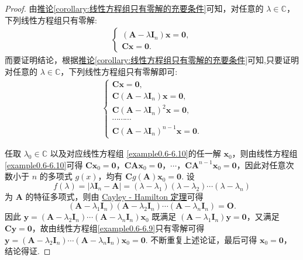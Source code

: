 \documentclass[../../main.tex]{subfiles}
\begin{document}
\begin{proof}
由\hyperref[corollary:线性方程组只有零解的充要条件]{推论\ref{corollary:线性方程组只有零解的充要条件}}可知，对任意的 $\lambda\in\mathbb{C}$，下列线性方程组只有零解:
\begin{align}
\begin{cases}
(\boldsymbol{A}-\lambda\boldsymbol{I}_n)\boldsymbol{x}=\boldsymbol{0}, \\
\boldsymbol{C}\boldsymbol{x}=\boldsymbol{0}.
\end{cases} \label{example0.6-6.9}
\end{align}
而要证明结论，根据\hyperref[corollary:线性方程组只有零解的充要条件]{推论\ref{corollary:线性方程组只有零解的充要条件}}可知,只要证明对任意的 $\lambda\in\mathbb{C}$，下列线性方程组只有零解即可:
\begin{align}
\begin{cases}
\boldsymbol{C}\boldsymbol{x}=\boldsymbol{0}, \\
\boldsymbol{C}(\boldsymbol{A}-\lambda\boldsymbol{I}_n)\boldsymbol{x}=\boldsymbol{0}, \\
\boldsymbol{C}(\boldsymbol{A}-\lambda\boldsymbol{I}_n)^2\boldsymbol{x}=\boldsymbol{0}, \\
\cdots\cdots\cdots \\
\boldsymbol{C}(\boldsymbol{A}-\lambda\boldsymbol{I}_n)^{n - 1}\boldsymbol{x}=\boldsymbol{0}.
\end{cases} \label{example0.6-6.10}
\end{align}

任取 $\lambda_0\in\mathbb{C}$ 以及对应线性方程组 \eqref{example0.6-6.10}的任一解 $\boldsymbol{x}_0$，则由线性方程组 \eqref{example0.6-6.10}可得 $\boldsymbol{C}\boldsymbol{x}_0=\boldsymbol{0}$，$\boldsymbol{C}\boldsymbol{A}\boldsymbol{x}_0=\boldsymbol{0}$，$\cdots$，$\boldsymbol{C}\boldsymbol{A}^{n - 1}\boldsymbol{x}_0=\boldsymbol{0}$，因此对任意次数小于 $n$ 的多项式 $g(x)$，均有 $\boldsymbol{C}g(\boldsymbol{A})\boldsymbol{x}_0=\boldsymbol{0}$. 设
\[f(\lambda)=|\lambda\boldsymbol{I}_n - \boldsymbol{A}|=(\lambda - \lambda_1)(\lambda - \lambda_2)\cdots(\lambda - \lambda_n)\]
为 $\boldsymbol{A}$ 的特征多项式，则由 \hyperref[theorem:Cayley-Hamilton定理]{Cayley - Hamilton 定理}可得
\[(\boldsymbol{A}-\lambda_1\boldsymbol{I}_n)(\boldsymbol{A}-\lambda_2\boldsymbol{I}_n)\cdots(\boldsymbol{A}-\lambda_n\boldsymbol{I}_n)=\boldsymbol{O}.\]
因此 $\boldsymbol{y}=(\boldsymbol{A}-\lambda_2\boldsymbol{I}_n)\cdots(\boldsymbol{A}-\lambda_n\boldsymbol{I}_n)\boldsymbol{x}_0$ 既满足 $(\boldsymbol{A}-\lambda_1\boldsymbol{I}_n)\boldsymbol{y}=\boldsymbol{0}$，又满足 $\boldsymbol{C}\boldsymbol{y}=\boldsymbol{0}$，故由线性方程组\eqref{example0.6-6.9}只有零解可得 $\boldsymbol{y}=(\boldsymbol{A}-\lambda_2\boldsymbol{I}_n)\cdots(\boldsymbol{A}-\lambda_n\boldsymbol{I}_n)\boldsymbol{x}_0=\boldsymbol{0}$. 不断重复上述论证，最后可得 $\boldsymbol{x}_0=\boldsymbol{0}$，结论得证. 
\end{proof}
\end{document}
